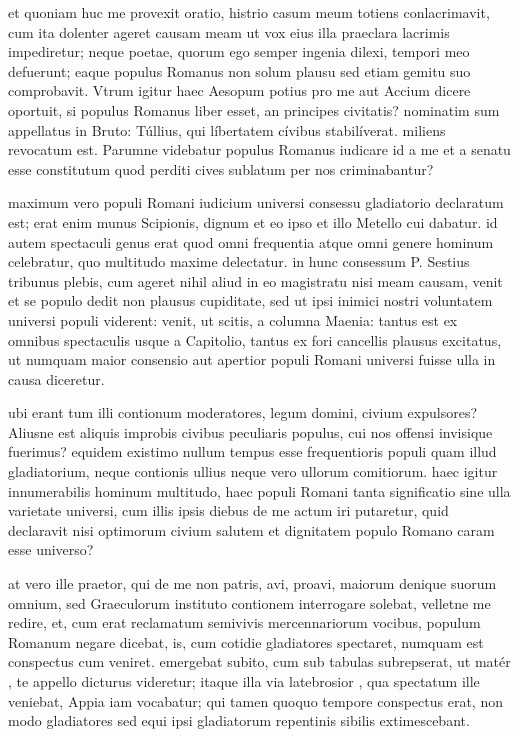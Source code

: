  et quoniam huc me provexit oratio, histrio casum meum totiens conlacrimavit, cum ita dolenter ageret causam meam ut vox eius illa praeclara lacrimis impediretur; neque poetae, quorum ego semper ingenia dilexi, tempori meo defuerunt; eaque populus Romanus non solum plausu sed etiam gemitu suo comprobavit. Vtrum igitur haec Aesopum potius pro me aut Accium dicere oportuit, si populus Romanus liber esset, an principes civitatis? nominatim sum appellatus in Bruto: Túllius, qui líbertatem cívibus stabilíverat. miliens revocatum est. Parumne videbatur populus Romanus iudicare id a me et a senatu esse constitutum quod perditi cives sublatum per nos criminabantur?

 maximum vero populi Romani iudicium universi consessu gladiatorio declaratum est; erat enim munus Scipionis, dignum et eo ipso et illo Metello cui dabatur. id autem spectaculi genus erat quod omni frequentia atque omni genere hominum celebratur, quo multitudo maxime delectatur. in hunc consessum P. Sestius tribunus plebis, cum ageret nihil aliud in eo magistratu nisi meam causam, venit et se populo dedit non plausus cupiditate, sed ut ipsi inimici nostri voluntatem universi populi viderent: venit, ut scitis, a columna Maenia: tantus est ex omnibus spectaculis usque a Capitolio, tantus ex fori cancellis plausus excitatus, ut numquam maior consensio aut apertior populi Romani universi fuisse ulla in causa diceretur.

 ubi erant tum illi contionum moderatores, legum domini, civium expulsores? Aliusne est aliquis improbis civibus peculiaris populus, cui nos offensi invisique fuerimus? equidem existimo nullum tempus esse frequentioris populi quam illud gladiatorium, neque contionis ullius neque vero ullorum comitiorum. haec igitur innumerabilis hominum multitudo, haec populi Romani tanta significatio sine ulla varietate universi, cum illis ipsis diebus de me actum iri putaretur, quid declaravit nisi optimorum civium salutem et dignitatem populo Romano caram esse universo?

 at vero ille praetor, qui de me non patris, avi, proavi, maiorum denique suorum omnium, sed Graeculorum instituto contionem interrogare solebat, velletne me redire, et, cum erat reclamatum semivivis mercennariorum vocibus, populum Romanum negare dicebat, is, cum cotidie gladiatores spectaret, numquam est conspectus cum veniret. emergebat subito, cum sub tabulas subrepserat, ut matér , te appello dicturus videretur; itaque illa via latebrosior , qua spectatum ille veniebat, Appia iam vocabatur; qui tamen quoquo tempore conspectus erat, non modo gladiatores sed equi ipsi gladiatorum repentinis sibilis extimescebant.


